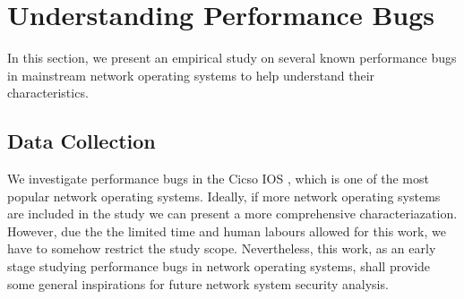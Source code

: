 \section{Understanding Performance Bugs} 
\label{s:study}
%
In this section, we present an empirical study on several known performance bugs in mainstream network operating systems 
to help understand their characteristics. %
%

\subsection{Data Collection}
\label{s:study-bug}

%
We investigate performance bugs in the Cicso IOS \cite{cicso-ios}, 
%
which is one of the most popular network operating systems.
%
Ideally, if more network operating systems are included in the study we can present a more comprehensive characteriazation.
%
However, due the the limited time and human labours allowed for this work,
%
we have to somehow restrict the study scope.
%
Nevertheless, this work, as an early stage studying performance bugs in network operating systems, shall provide some general inspirations for future network system security analysis.

